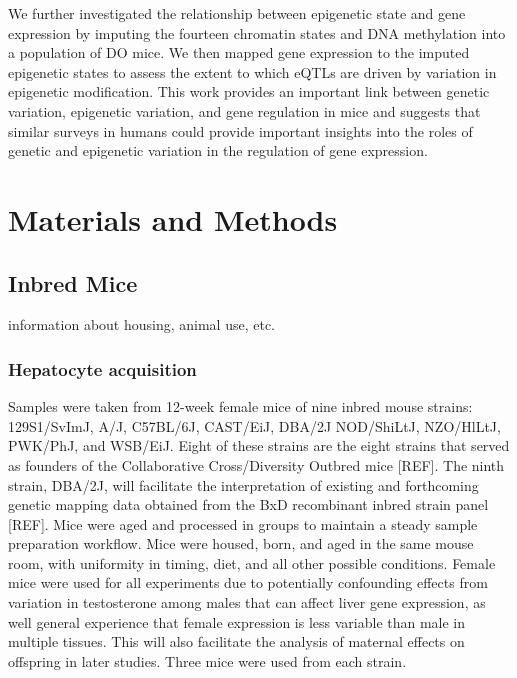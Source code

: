 \documentclass[10pt,letterpaper]{article}
\begin{document}
We further investigated the relationship between epigenetic state and
gene expression by imputing the fourteen chromatin states and DNA
methylation into a population of DO mice. We then mapped gene expression
to the imputed epigenetic states to assess the extent to which eQTLs are
driven by variation in epigenetic modification. This work provides an
important link between genetic variation, epigenetic variation, and gene
regulation in mice and suggests that similar surveys in humans could
provide important insights into the roles of genetic and epigenetic
variation in the regulation of gene expression.

\hypertarget{materials-and-methods}{%
\section{Materials and Methods}\label{materials-and-methods}}

\hypertarget{inbred-mice}{%
\subsection{Inbred Mice}\label{inbred-mice}}

information about housing, animal use, etc.

\hypertarget{hepatocyte-acquisition}{%
\subsubsection{Hepatocyte acquisition}\label{hepatocyte-acquisition}}

Samples were taken from 12-week female mice of nine inbred mouse
strains: 129S1/SvImJ, A/J, C57BL/6J, CAST/EiJ, DBA/2J NOD/ShiLtJ,
NZO/HlLtJ, PWK/PhJ, and WSB/EiJ. Eight of these strains are the eight
strains that served as founders of the Collaborative Cross/Diversity
Outbred mice {[}REF{]}. The ninth strain, DBA/2J, will facilitate the
interpretation of existing and forthcoming genetic mapping data obtained
from the BxD recombinant inbred strain panel {[}REF{]}. Mice were aged
and processed in groups to maintain a steady sample preparation
workflow. Mice were housed, born, and aged in the same mouse room, with
uniformity in timing, diet, and all other possible conditions. Female
mice were used for all experiments due to potentially confounding
effects from variation in testosterone among males that can affect liver
gene expression, as well general experience that female expression is
less variable than male in multiple tissues. This will also facilitate
the analysis of maternal effects on offspring in later studies. Three
mice were used from each strain.
\end{document}
